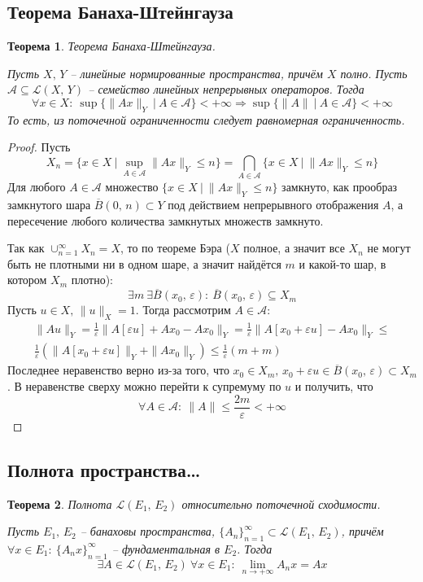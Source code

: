 \documentclass[a4paper,12pt]{article}
\renewcommand{\leq}{\ensuremath{\leqslant}}
\theoremstyle{plain}
\newtheorem{theorem}{Теорема}[section]
\theoremstyle{definition}
\theoremstyle{remark}
\begin{document}
\subsection{Теорема Банаха-Штейнгауза}
\begin{theorem}
	Теорема Банаха-Штейнгауза.

	Пусть $X,\,Y$ -- линейные нормированные пространства, причём $X$ полно. Пусть $\mathcal{A} \subseteq \mathcal{L}(X,\, Y)$ -- семейство линейных непрерывных операторов. Тогда
	\[
		\forall x \in X :\: \sup \{\|Ax\|_Y \:\vert\: A \in \mathcal{A}\} < +\infty \Rightarrow \sup\{\|A\| \:\vert\: A \in \mathcal{A}\} < +\infty
	\]
	То есть, из поточечной ограниченности следует равномерная ограниченность.
\end{theorem}

\begin{proof}
	Пусть
	\[
		X_n = \{x \in X \:\vert\: \sup_{A \in \mathcal{A}} \|Ax\|_Y \leq n\} = \bigcap_{A \in \mathcal{A}} \{x \in X \:\vert\: \|Ax\|_Y \leq n\}
	\]
	Для любого $A \in \mathcal{A}$ множество $\{x \in X \:\vert\: \|Ax\|_Y \leq n\}$ замкнуто, как прообраз замкнутого шара $\overline{B}(0,\,n) \subset Y$ под действием непрерывного отображения $A$, а пересечение любого количества замкнутых множеств замкнуто.

	Так как $\cup_{n = 1}^\infty X_n = X$, то по теореме Бэра ($X$ полное, а значит все $X_n$ не могут быть не плотными ни в одном шаре, а значит найдётся $m$ и какой-то шар, в котором $X_m$ плотно):
	\[
		\exists m \: \exists \overline{B}(x_0,\,\varepsilon) :\: \overline{B}(x_0,\, \varepsilon) \subseteq X_m
	\]
	Пусть $u \in X,\, \|u\|_X = 1$. Тогда рассмотрим $A \in \mathcal{A}$:
	\begin{align*}
		\|Au\|_Y = \frac{1}{\varepsilon}\|A[\varepsilon u] + Ax_0 - Ax_0\|_Y = \frac{1}{\varepsilon}\|A[x_0 + \varepsilon u] - Ax_0\|_Y \leq \\
		\frac{1}{\varepsilon}\left(\|A[x_0 + \varepsilon u]\|_Y + \|Ax_0\|_Y\right) \leq \frac{1}{\varepsilon}(m + m)
	\end{align*}
	Последнее неравенство верно из-за того, что $x_0 \in X_m,\, x_0 + \varepsilon u \in \overline{B}(x_0,\,\varepsilon) \subset X_m$. В неравенстве сверху можно перейти к супремуму по $u$ и получить, что
	\[
		\forall A \in \mathcal{A} :\: \|A\| \leq \frac{2m}{\varepsilon} < +\infty
	\]
\end{proof}

\subsection{Полнота пространства\dots}
\begin{theorem}
	Полнота $\mathcal{L}(E_1,\, E_2)$ относительно поточечной сходимости.

	Пусть $E_1,\, E_2$ -- банаховы пространства, $\{A_n\}_{n=1}^\infty \subset \mathcal{L}(E_1,\, E_2)$, причём $\forall x \in E_1 :\: \{A_nx\}_{n=1}^\infty$ -- фундаментальная в $E_2$. Тогда
	\[
		\exists A \in \mathcal{L}(E_1,\, E_2) \: \forall x \in E_1 :\: \lim_{n \to +\infty} A_nx = Ax
	\]
\end{theorem}
\end{document}
